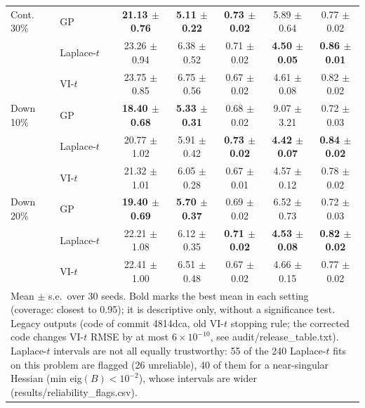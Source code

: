 \begin{tabular}{llccccc}
\midrule
Cont. 30\% & GP & \textbf{21.13 $\pm$ 0.76} & \textbf{5.11 $\pm$ 0.22} & \textbf{0.73 $\pm$ 0.02} & 5.89 $\pm$ 0.64 & 0.77 $\pm$ 0.02 \\
 & Laplace-$t$ & 23.26 $\pm$ 0.94 & 6.38 $\pm$ 0.52 & 0.71 $\pm$ 0.02 & \textbf{4.50 $\pm$ 0.05} & \textbf{0.86 $\pm$ 0.01} \\
 & VI-$t$ & 23.75 $\pm$ 0.85 & 6.75 $\pm$ 0.56 & 0.67 $\pm$ 0.02 & 4.61 $\pm$ 0.08 & 0.82 $\pm$ 0.02 \\
\midrule
Down 10\% & GP & \textbf{18.40 $\pm$ 0.68} & \textbf{5.33 $\pm$ 0.31} & 0.68 $\pm$ 0.02 & 9.07 $\pm$ 3.21 & 0.72 $\pm$ 0.03 \\
 & Laplace-$t$ & 20.77 $\pm$ 1.02 & 5.91 $\pm$ 0.42 & \textbf{0.73 $\pm$ 0.02} & \textbf{4.42 $\pm$ 0.07} & \textbf{0.84 $\pm$ 0.02} \\
 & VI-$t$ & 21.32 $\pm$ 1.01 & 6.05 $\pm$ 0.28 & 0.67 $\pm$ 0.01 & 4.57 $\pm$ 0.12 & 0.78 $\pm$ 0.02 \\
\midrule
Down 20\% & GP & \textbf{19.40 $\pm$ 0.69} & \textbf{5.70 $\pm$ 0.37} & 0.69 $\pm$ 0.02 & 6.52 $\pm$ 0.73 & 0.72 $\pm$ 0.03 \\
 & Laplace-$t$ & 22.21 $\pm$ 1.08 & 6.12 $\pm$ 0.35 & \textbf{0.71 $\pm$ 0.02} & \textbf{4.53 $\pm$ 0.08} & \textbf{0.82 $\pm$ 0.02} \\
 & VI-$t$ & 22.41 $\pm$ 1.00 & 6.51 $\pm$ 0.48 & 0.67 $\pm$ 0.02 & 4.66 $\pm$ 0.15 & 0.77 $\pm$ 0.02 \\
\bottomrule
\multicolumn{7}{p{14cm}}{\footnotesize Mean $\pm$ s.e.\ over 30 seeds. Bold marks the best mean in each setting (coverage: closest to 0.95); it is descriptive only, without a significance test. Legacy outputs (code of commit 4814dca, old VI-$t$ stopping rule; the corrected code changes VI-$t$ RMSE by at most $6\times10^{-10}$, see audit/release\_table.txt). Laplace-$t$ intervals are not all equally trustworthy: 55 of the 240 Laplace-$t$ fits on this problem are flagged (26 unreliable), 40 of them for a near-singular Hessian (min eig$(B)<10^{-2}$), whose intervals are wider (results/reliability\_flags.csv).} \\
\end{tabular}
